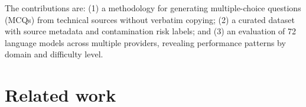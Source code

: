 \documentclass[11pt]{article}
\begin{document}
The contributions are: (1) a methodology for generating multiple-choice questions (MCQs) from technical sources without verbatim copying; (2) a curated dataset with source metadata and contamination risk labels; and (3) an evaluation of 72 language models across multiple providers, revealing performance patterns by domain and difficulty level.


%
%
%
%
%

\section{Related work}
\end{document}
